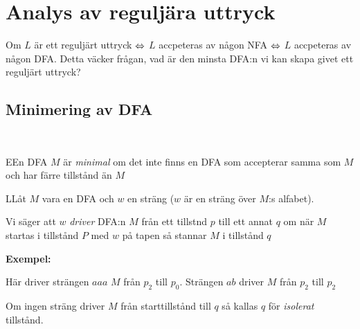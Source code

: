 \section{Analys av reguljära uttryck}\par
\noindent Om $L$ är ett reguljärt uttryck $\Leftrightarrow$ $L$ accpeteras av någon NFA $\Leftrightarrow$ $L$ accpeteras av någon DFA. Detta väcker frågan, vad är den minsta DFA:n vi kan skapa givet ett reguljärt uttryck?
\par\bigskip
\subsection{Minimering av DFA}\hfill\\\par
\begin{theo}
  EEn DFA $M$ är \textit{minimal} om det inte finns en DFA som accepterar samma som $M$ och har färre tillstånd än $M$
\end{theo}
\par\bigskip
\begin{theo}
  LLåt $M$ vara en DFA och $w$ en sträng ($w$ är en sträng över $M$:s alfabet).\par
  \noindent Vi säger att $w$ \textit{driver} DFA:n $M$ från ett tillstnd $p$ till ett annat $q$ om när $M$ startas i tillstånd $P$ med $w$ på tapen så stannar $M$ i tillstånd $q$ 
\end{theo}
\par\bigskip
\noindent\textbf{Exempel:}\par
\begin{figure}[ht!]
    \centering
    \caption{}
\end{figure}\par
\noindent Här driver strängen $aaa$ $M$ från $p_2$ till $p_0$. Strängen $ab$ driver $M$ från $p_2$ till $p_2$
\par\bigskip
\noindent Om ingen sträng driver $M$ från starttillstånd till $q$ så kallas $q$ för \textit{isolerat} tillstånd.
